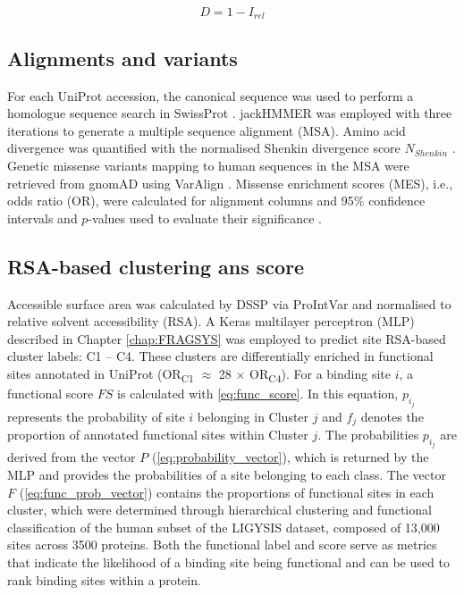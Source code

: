 \begin{equation}
D = 1 - I_{rel}
\label{eq:Irel_distance}
\end{equation}

\subsection{Alignments and variants}

For each UniProt accession, the canonical sequence was used to perform a homologue sequence search in SwissProt \cite{BOUTET_2016_UNIPROT}. jackHMMER \cite{EDDY_1995_HMMER} was employed with three iterations to generate a multiple sequence alignment (MSA). Amino acid divergence was quantified with the normalised Shenkin divergence score \cite{SHENKIN_1991_SCORE} $N_{Shenkin}$ \cite{UTGES_2021_ANKS}. Genetic missense variants mapping to human sequences in the MSA were retrieved from gnomAD \cite{KARCZEWSKI_2020_GNOMAD} using VarAlign \cite{MACGOWAN_2017_VARIANTS}. Missense enrichment scores (MES), i.e., odds ratio (OR), were calculated for alignment columns \cite{MACGOWAN_2024_VARIANTS} and 95\% confidence intervals and $p$-values used to evaluate their significance \cite{SZUMILAS_2010_ODDSRATIOS}.

\subsection{RSA-based clustering ans score}

Accessible surface area was calculated by DSSP \cite{KABSCH_1983_DSSP} via ProIntVar \cite{MACGOWAN_2020_DRSASP} and normalised \cite{TIEN_2013_RSA} to relative solvent accessibility (RSA). A Keras \cite{CHOLLET_2015_KERAS} multilayer perceptron (MLP) \cite{CYBENKO_1989_MLP} described in Chapter \ref{chap:FRAGSYS} \cite{UTGES_2024_FRAGSYS} was employed to predict site RSA-based cluster labels: C1 – C4. These clusters are differentially enriched in functional sites annotated in UniProt \cite{NIGHTINGALE_2017_API} (OR\textsubscript{C1} $\approx$ 28 $\times$ OR\textsubscript{C4}). For a binding site $i$, a functional score $FS$ is calculated with \autoref{eq:func_score}. In this equation, $p_{i_{j}}$ represents the probability of site $i$ belonging in Cluster $j$ and $f_j$ denotes the proportion of annotated functional sites within Cluster $j$. The probabilities $p_{i_{j}}$ are derived from the vector $P$ (\autoref{eq:probability_vector}), which is returned by the MLP and provides the probabilities of a site belonging to each class. The vector $F$ (\autoref{eq:func_prob_vector}) contains the proportions of functional sites in each cluster, which were determined through hierarchical clustering and functional classification of the human subset of the LIGYSIS dataset, composed of 13,000 sites across 3500 proteins. Both the functional label and score serve as metrics that indicate the likelihood of a binding site being functional and can be used to rank binding sites within a protein.

